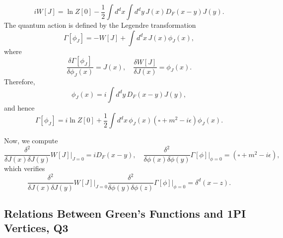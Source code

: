 \begin{solution}
\begin{equation}
    iW[J] = \ln Z[0] - \frac{1}{2}\int d^dx\int d^dy \, J(x)D_F(x-y)J(y).
\end{equation}
The quantum action is defined by the Legendre transformation
\begin{equation}
    \Gamma[\phi_J] = -W[J] + \int d^dx\, J(x)\phi_J(x),
\end{equation}
where 
\begin{equation}
    \frac{\delta\Gamma[\phi_J]}{\delta\phi_J(x)} = J(x),\quad \frac{\delta W[J]}{\delta J(x)} = \phi_J(x).
\end{equation}
Therefore,
\begin{equation}
    \phi_J(x) = i\int d^dy\, D_F(x-y) J(y),
\end{equation}
and hence
\begin{equation}
    \Gamma[\phi_J] = i\ln Z[0] + \frac{1}{2}\int d^dx \, \phi_J(x)(\square +m^2 - i\epsilon)\phi_J(x).
\end{equation}

Now, we compute 
\begin{equation}
    \frac{\delta^2}{\delta J(x)\delta J(y)}W[J]\bigg|_{J=0} = iD_F(x-y), \quad \frac{\delta^2}{\delta\phi(x)\delta\phi(y)}\Gamma[\phi]\bigg|_{\phi=0} =  (\square + m^2 - i\epsilon),
\end{equation}
which verifies
\begin{equation}
    \frac{\delta^2}{\delta J(x)\delta J(y)}W[J]\bigg|_{J=0}\frac{\delta^2}{\delta\phi(y)\delta\phi(z)}\Gamma[\phi]\bigg|_{\phi=0} = \delta^d(x-z).
\end{equation}
    
\end{solution}

\subsection{Relations Between Green's Functions and 1PI Vertices, Q3}

